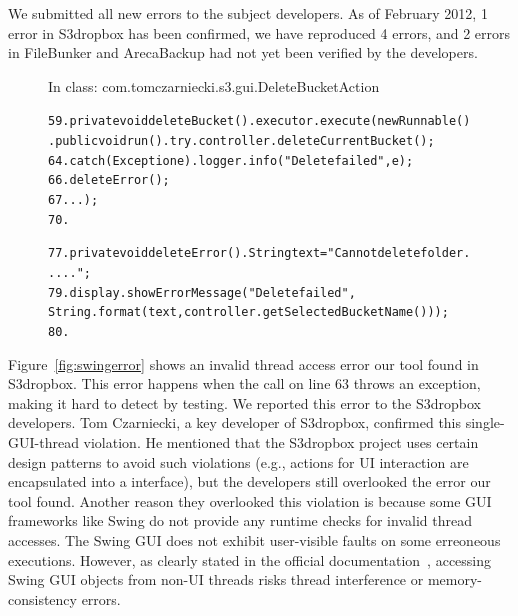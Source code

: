We submitted all \newbugs new errors
to the subject developers. As of February 2012, 1 error in S3dropbox has been confirmed,
we have reproduced 4 errors, and 2 errors in FileBunker and ArecaBackup
had not yet been verified by the developers.



\begin{figure}[t]
\hspace{4mm}\small{In class: com.tomczarniecki.s3.gui.DeleteBucketAction}
\vspace{-2mm}
\begin{CodeOut}
\begin{alltt}
59.private void deleteBucket() .    executor.execute(new Runnable() .        public void run() .            try .                controller.deleteCurrentBucket();
64.            {\ttrcb} catch (Exception e) .                logger.info("Delete failed", e);
66.                deleteError(); 
67.            .       .    \ttrcb);
70.\ttrcb

77.private void deleteError() .    String text = "Cannot delete folder .....";
79.    display.showErrorMessage("Delete failed", 
        String.format(text, controller.getSelectedBucketName())); 
80.\ttrcb
\smallstep
\end{alltt}
\end{CodeOut}
\smallstep
\vspace*{-2.0ex}  %
\end{figure}

Figure~\ref{fig:swingerror}
shows an invalid thread access error our tool found in S3dropbox.
This error happens when the 
call on line 63 throws an exception, making it hard to
detect by testing. We reported this error to the S3dropbox developers. Tom Czarniecki,
a key developer of S3dropbox, confirmed this single-GUI-thread
violation. He mentioned that the S3dropbox project uses
certain design patterns to avoid such violations (e.g.,
actions for UI interaction are encapsulated into a  interface),
but the developers still overlooked  the error our tool found.
Another reason they overlooked this violation is because some GUI frameworks like Swing
do not provide any runtime checks for invalid thread accesses. The Swing
GUI does not exhibit user-visible faults on some erreoneous executions.
However, as clearly stated in the official documentation~\cite{swing}, %
accessing Swing GUI objects from non-UI threads risks thread interference
or memory-consistency errors.



